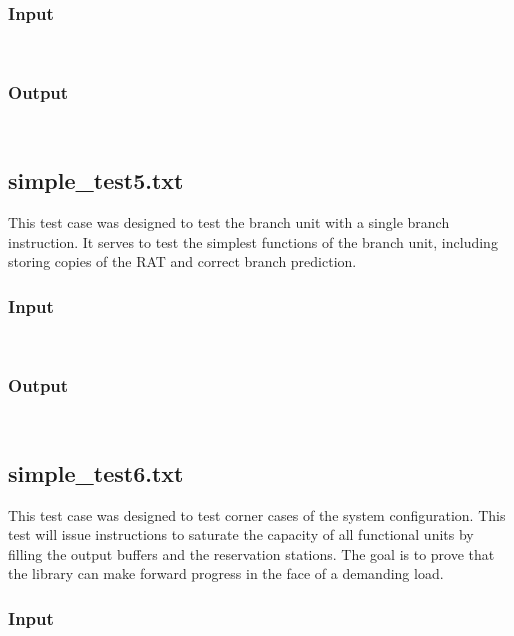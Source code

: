 \documentclass[12pt]{article}
\begin{document}
\subsubsection*{Input}
\begin{verbatim}
    
\end{verbatim}

\subsubsection*{Output}
\begin{verbatim}
    
\end{verbatim}

\subsection{simple\_test5.txt}
This test case was designed to test the branch unit with a single branch instruction.  It serves to test the simplest functions of the branch unit, including storing copies of the RAT and correct branch prediction.

\subsubsection*{Input}
\begin{verbatim}
    
\end{verbatim}

\subsubsection*{Output}
\begin{verbatim}
    
\end{verbatim}

\subsection{simple\_test6.txt}
This test case was designed to test corner cases of the system configuration.  This test will issue instructions to saturate the capacity of all functional units by filling the output buffers and the reservation stations.  The goal is to prove that the library can make forward progress in the face of a demanding load.

\subsubsection*{Input}
\begin{verbatim}
    
\end{verbatim}
\end{document}

